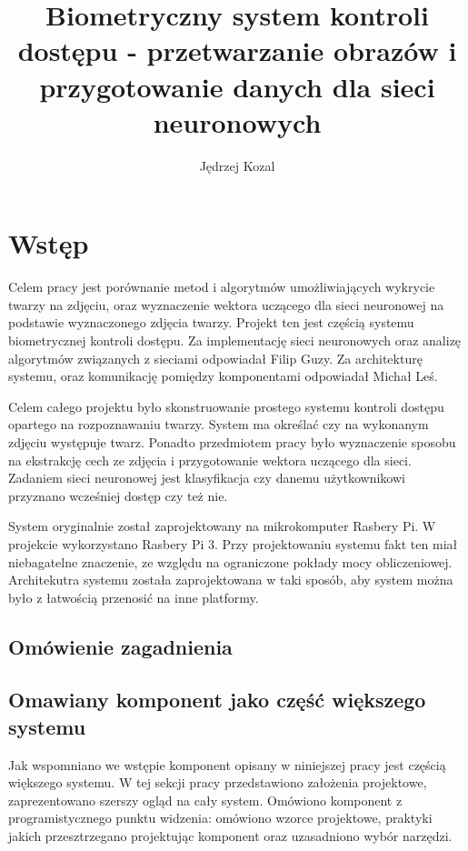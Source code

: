 \documentclass[oneside, eng]{mgr}
\title{Biometryczny system kontroli dostępu - przetwarzanie obrazów i przygotowanie danych dla sieci neuronowych}
\author{Jędrzej Kozal}
\begin{document}


\maketitle

\linespread{1.5}

\chapter{Wstęp}
Celem pracy jest porównanie metod i algorytmów umożliwiających wykrycie twarzy na zdjęciu, oraz wyznaczenie wektora uczącego dla sieci neuronowej na podstawie wyznaczonego zdjęcia twarzy. Projekt ten jest częścią systemu biometrycznej kontroli dostępu. Za implementację sieci neuronowych oraz analizę algorytmów związanych z sieciami odpowiadał Filip Guzy. Za architekturę systemu, oraz komunikację pomiędzy komponentami odpowiadał Michał Leś. 

Celem całego projektu było skonstruowanie prostego systemu kontroli dostępu opartego na rozpoznawaniu twarzy. System ma określać czy na wykonanym zdjęciu występuje twarz. Ponadto przedmiotem pracy było wyznaczenie sposobu na ekstrakcję cech ze zdjęcia i przygotowanie wektora uczącego dla sieci. Zadaniem sieci neuronowej jest klasyfikacja czy danemu użytkownikowi przyznano wcześniej dostęp czy też nie.

System oryginalnie został zaprojektowany na mikrokomputer Rasbery Pi. W projekcie wykorzystano Rasbery Pi 3. Przy projektowaniu systemu fakt ten miał niebagatelne znaczenie, ze względu na ograniczone pokłady mocy obliczeniowej. Architekutra systemu została zaprojektowana w taki sposób, aby system można było z łatwością przenosić na inne platformy. 


\section{Omówienie zagadnienia}

\section{Omawiany komponent jako część większego systemu}

Jak wspomniano we wstępie komponent opisany w niniejszej pracy jest częścią większego systemu. W tej sekcji pracy przedstawiono założenia projektowe, zaprezentowano szerszy ogląd na cały system. Omówiono komponent z programistycznego punktu widzenia: omówiono wzorce projektowe, praktyki jakich przesztrzegano projektując komponent oraz uzasadniono wybór narzędzi.
\end{document}

